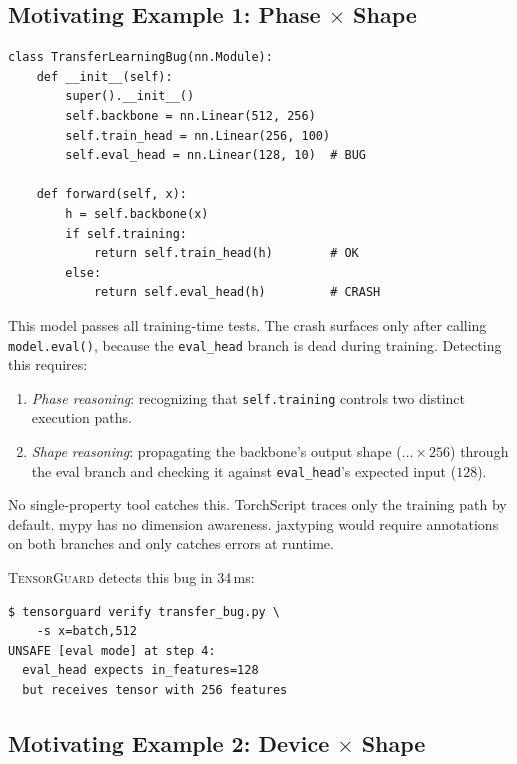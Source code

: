 \documentclass[10pt]{article}
\newcommand{\tguard}{\textsc{TensorGuard}}
\theoremstyle{plain}
\theoremstyle{definition}
\theoremstyle{remark}
\begin{document}
\subsection{Motivating Example 1: Phase $\times$ Shape}\label{sec:ex-phase}

\begin{lstlisting}[caption={Transfer learning bug from a torchvision-derived model.
  The eval-mode head expects 128 features but receives 256.},
  label={lst:phase-shape}]
class TransferLearningBug(nn.Module):
    def __init__(self):
        super().__init__()
        self.backbone = nn.Linear(512, 256)
        self.train_head = nn.Linear(256, 100)
        self.eval_head = nn.Linear(128, 10)  # BUG

    def forward(self, x):
        h = self.backbone(x)
        if self.training:
            return self.train_head(h)        # OK
        else:
            return self.eval_head(h)         # CRASH
\end{lstlisting}

This model passes all training-time tests.  The crash surfaces only
after calling \texttt{model.eval()}, because the \texttt{eval\_head}
branch is dead during training.  Detecting this requires:
\begin{enumerate}[nosep]
  \item \emph{Phase reasoning}: recognizing that \texttt{self.training}
    controls two distinct execution paths.
  \item \emph{Shape reasoning}: propagating the backbone's output
    shape ($\ldots \times 256$) through the eval branch and checking
    it against \texttt{eval\_head}'s expected input ($128$).
\end{enumerate}
No single-property tool catches this.  TorchScript traces only the
training path by default.  mypy has no dimension awareness.
jaxtyping would require annotations on both branches and only catches
errors at runtime.

\tguard{} detects this bug in 34\,ms:
\begin{lstlisting}[style=noline]
$ tensorguard verify transfer_bug.py \
    -s x=batch,512
UNSAFE [eval mode] at step 4:
  eval_head expects in_features=128
  but receives tensor with 256 features
\end{lstlisting}

\subsection{Motivating Example 2: Device $\times$ Shape}\label{sec:ex-device}
\end{document}
